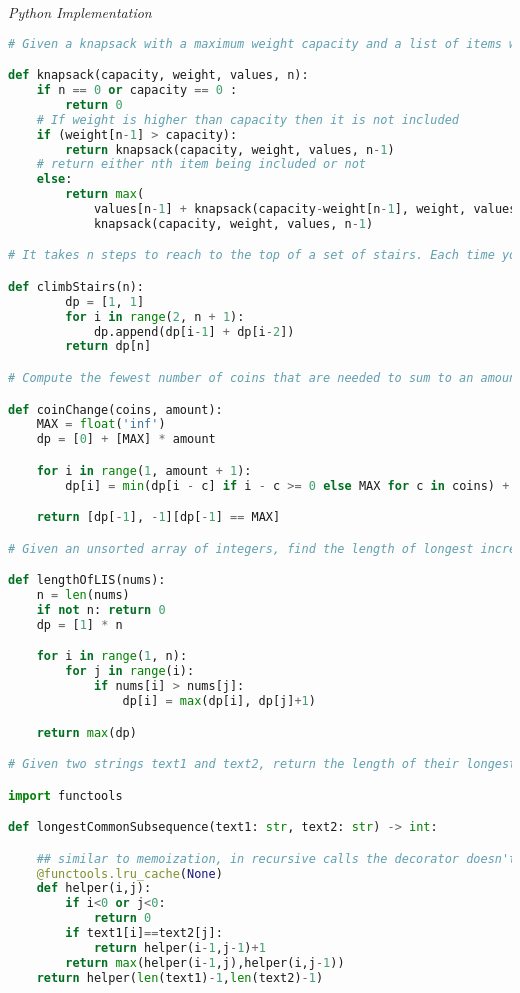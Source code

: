 \documentclass{article}
\begin{document}
\vspace{8pt} \emph{Python Implementation}
\begin{lstlisting}[language=Python]
# Given a knapsack with a maximum weight capacity and a list of items with value and weights, maximize the amount of value we can fit within the knapsacks weight capacity.

def knapsack(capacity, weight, values, n):
    if n == 0 or capacity == 0 :
        return 0
    # If weight is higher than capacity then it is not included
    if (weight[n-1] > capacity):
        return knapsack(capacity, weight, values, n-1)
    # return either nth item being included or not
    else:
        return max(
            values[n-1] + knapsack(capacity-weight[n-1], weight, values, n-1),
            knapsack(capacity, weight, values, n-1)

# It takes n steps to reach to the top of a set of stairs. Each time you can either climb 1 or 2 steps. In how many distinct ways can you climb to the top?

def climbStairs(n):
        dp = [1, 1]
        for i in range(2, n + 1):
            dp.append(dp[i-1] + dp[i-2])
        return dp[n]

# Compute the fewest number of coins that are needed to sum to an amount

def coinChange(coins, amount):
    MAX = float('inf')
    dp = [0] + [MAX] * amount

    for i in range(1, amount + 1):
        dp[i] = min(dp[i - c] if i - c >= 0 else MAX for c in coins) + 1

    return [dp[-1], -1][dp[-1] == MAX]

# Given an unsorted array of integers, find the length of longest increasing subsequence.

def lengthOfLIS(nums):
    n = len(nums)
    if not n: return 0
    dp = [1] * n

    for i in range(1, n):
        for j in range(i):
            if nums[i] > nums[j]:
                dp[i] = max(dp[i], dp[j]+1)

    return max(dp)

# Given two strings text1 and text2, return the length of their longest common subsequence.

import functools

def longestCommonSubsequence(text1: str, text2: str) -> int:

    ## similar to memoization, in recursive calls the decorator doesn't have to recompute but retrieves from the cache
    @functools.lru_cache(None)
    def helper(i,j):
        if i<0 or j<0:
            return 0
        if text1[i]==text2[j]:
            return helper(i-1,j-1)+1
        return max(helper(i-1,j),helper(i,j-1))
    return helper(len(text1)-1,len(text2)-1)

\end{lstlisting}
\end{document}
